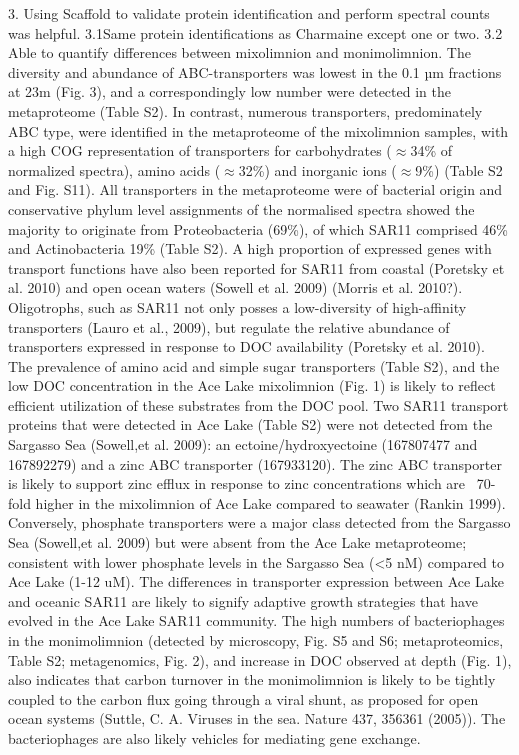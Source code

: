 3. Using Scaffold to validate protein identification and perform spectral counts was helpful. 
3.1Same protein identifications as Charmaine except one or two.
3.2 Able to quantify differences between mixolimnion and monimolimnion.
The diversity and abundance of ABC-transporters was lowest in the 0.1 µm fractions at 23m (Fig. 3), and a correspondingly low number were detected in the metaproteome (Table S2). 
In contrast, numerous transporters, predominately ABC type, were identified in the metaproteome of the mixolimnion samples, with a high COG representation of transporters for carbohydrates ($\approx$34\% of normalized spectra), amino acids ($\approx$32\%) and inorganic ions ($\approx$9\%) (Table S2 and Fig. S11).
All transporters in the metaproteome were of bacterial origin and conservative phylum level assignments of the normalised spectra showed the majority to originate from Proteobacteria (69\%), 
of which SAR11 comprised 46\% and Actinobacteria 19\% (Table S2). 
A high proportion of expressed genes with transport functions have also been reported for SAR11 from coastal (Poretsky et al. 2010) and open ocean waters (Sowell et al. 2009) (Morris et al. 2010?). 
Oligotrophs, such as SAR11 not only posses a low-diversity of high-affinity transporters (Lauro et al., 2009), but regulate the relative abundance of transporters expressed in response to DOC availability (Poretsky et al. 2010). 
The prevalence of amino acid and simple sugar transporters (Table S2), and the low DOC concentration in the Ace Lake mixolimnion (Fig. 1) is likely to reflect efficient utilization of these substrates from the DOC pool. 
Two SAR11 transport proteins that were detected in Ace Lake (Table S2) were not detected from the Sargasso Sea (Sowell,et al. 2009): an ectoine/hydroxyectoine (167807477 and 167892279) and a zinc ABC transporter (167933120). The zinc ABC transporter is likely to support zinc efflux in response to zinc concentrations which are ~70-fold higher in the mixolimnion of Ace Lake compared to seawater (Rankin 1999). Conversely, phosphate transporters were a major class detected from the Sargasso Sea (Sowell,et al. 2009) but were absent from the Ace Lake metaproteome; consistent with lower phosphate levels in the Sargasso Sea (<5 nM) compared to Ace Lake (1-12 uM). The differences in transporter expression between Ace Lake and oceanic SAR11 are likely to signify adaptive growth strategies that have evolved in the Ace Lake SAR11 community.
The high numbers of bacteriophages in the monimolimnion (detected by microscopy, Fig. S5 and S6; metaproteomics, Table S2; metagenomics, Fig. 2), and increase in DOC observed at depth (Fig. 1), also indicates that carbon turnover in the monimolimnion is likely to be tightly coupled to the carbon flux going through a viral shunt, as proposed for open ocean systems (Suttle, C. A. Viruses in the sea. Nature 437, 356361 (2005)). The bacteriophages are also likely vehicles for mediating gene exchange.
